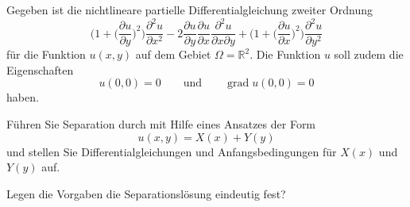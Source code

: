 Gegeben ist die nichtlineare partielle Differentialgleichung 
zweiter Ordnung
\begin{equation}
\biggl(1+\biggl(\frac{\partial u}{\partial y}\biggr)^2\biggr)
\frac{\partial^2 u}{\partial x^2}
-2
\frac{\partial u}{\partial y}
\frac{\partial u}{\partial x}
\frac{\partial^2 u}{\partial x\partial y}
+
\biggl(1+\biggl(\frac{\partial u}{\partial x}\biggr)^2\biggr)
\frac{\partial^2 u}{\partial y^2}
\label{40000016:dgl}
\end{equation}
für die Funktion $u(x,y)$ auf dem Gebiet $\Omega =\mathbb R^2$.
Die Funktion $u$ soll zudem die Eigenschaften
\[
u(0,0)=0
\qquad\text{und}\qquad
\operatorname{grad} u(0,0)=0
\]
haben.
\begin{teilaufgaben}
\item
Führen Sie Separation durch mit Hilfe eines Ansatzes der Form
\begin{equation}
u(x,y) = X(x) + Y(y)
\label{40000016:ansatz}
\end{equation}
und stellen Sie Differentialgleichungen und Anfangsbedingungen
für $X(x)$ und $Y(y)$ auf.
\item
Legen die Vorgaben die Separationslösung eindeutig fest?
\end{teilaufgaben}

